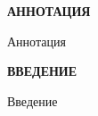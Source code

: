 \newpage
\begin{center}
  \textbf{\large АННОТАЦИЯ}
\end{center}

Аннотация

\onehalfspacing
\setcounter{page}{2}

\newpage
\renewcommand{\contentsname}{\centerline{\large СОДЕРЖАНИЕ}}
\tableofcontents

\newpage
\begin{center}
  \textbf{\large ВВЕДЕНИЕ}
\end{center}

Введение